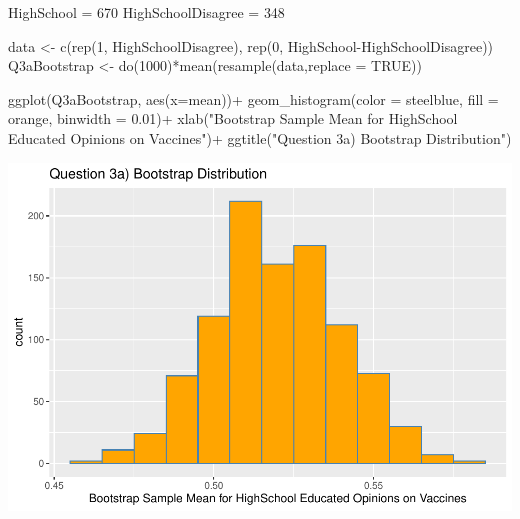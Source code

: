 \documentclass[
]{article}
\newenvironment{Shaded}{\begin{snugshade}}{\end{snugshade}}
\newcommand{\AttributeTok}[1]{\textcolor[rgb]{0.77,0.63,0.00}{#1}}
\newcommand{\ConstantTok}[1]{\textcolor[rgb]{0.00,0.00,0.00}{#1}}
\newcommand{\DecValTok}[1]{\textcolor[rgb]{0.00,0.00,0.81}{#1}}
\newcommand{\FloatTok}[1]{\textcolor[rgb]{0.00,0.00,0.81}{#1}}
\newcommand{\FunctionTok}[1]{\textcolor[rgb]{0.00,0.00,0.00}{#1}}
\newcommand{\NormalTok}[1]{#1}
\newcommand{\OtherTok}[1]{\textcolor[rgb]{0.56,0.35,0.01}{#1}}
\newcommand{\SpecialCharTok}[1]{\textcolor[rgb]{0.00,0.00,0.00}{#1}}
\newcommand{\StringTok}[1]{\textcolor[rgb]{0.31,0.60,0.02}{#1}}
\begin{document}
\begin{Shaded}
\begin{Highlighting}[]
\NormalTok{HighSchool }\OtherTok{=} \DecValTok{670}
\NormalTok{HighSchoolDisagree }\OtherTok{=} \DecValTok{348}

\NormalTok{data }\OtherTok{\textless{}{-}} \FunctionTok{c}\NormalTok{(}\FunctionTok{rep}\NormalTok{(}\DecValTok{1}\NormalTok{, HighSchoolDisagree), }\FunctionTok{rep}\NormalTok{(}\DecValTok{0}\NormalTok{, HighSchool}\SpecialCharTok{{-}}\NormalTok{HighSchoolDisagree))}
\NormalTok{Q3aBootstrap }\OtherTok{\textless{}{-}} \FunctionTok{do}\NormalTok{(}\DecValTok{1000}\NormalTok{)}\SpecialCharTok{*}\FunctionTok{mean}\NormalTok{(}\FunctionTok{resample}\NormalTok{(data,}\AttributeTok{replace =} \ConstantTok{TRUE}\NormalTok{))}

\FunctionTok{ggplot}\NormalTok{(Q3aBootstrap, }\FunctionTok{aes}\NormalTok{(}\AttributeTok{x=}\NormalTok{mean))}\SpecialCharTok{+}
  \FunctionTok{geom\_histogram}\NormalTok{(}\AttributeTok{color =} \StringTok{\textquotesingle{}steelblue\textquotesingle{}}\NormalTok{, }\AttributeTok{fill =} \StringTok{\textquotesingle{}orange\textquotesingle{}}\NormalTok{, }\AttributeTok{binwidth =} \FloatTok{0.01}\NormalTok{)}\SpecialCharTok{+}
  \FunctionTok{xlab}\NormalTok{(}\StringTok{"Bootstrap Sample Mean for HighSchool Educated Opinions on Vaccines"}\NormalTok{)}\SpecialCharTok{+}
  \FunctionTok{ggtitle}\NormalTok{(}\StringTok{"Question 3a) Bootstrap Distribution"}\NormalTok{)}
\end{Highlighting}
\end{Shaded}

\includegraphics{Assignment2_files/figure-latex/Q3-1.pdf}
\end{document}
